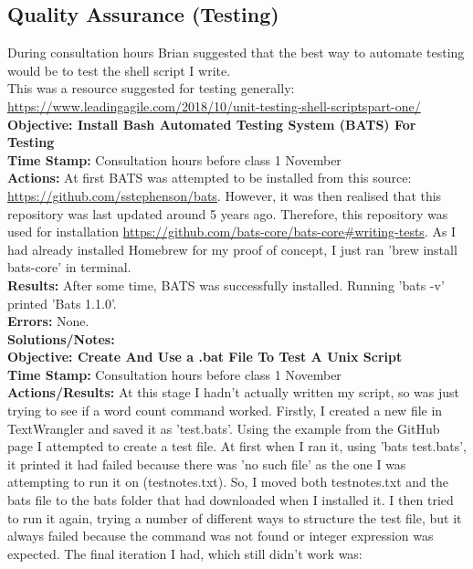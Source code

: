 \documentclass{article}
\begin{document}
\begin{FlushLeft}
\subsection{Quality Assurance (Testing)}
During consultation hours Brian suggested that the best way to automate testing would be to test the shell script I write.\\
This was a resource suggested for testing generally: \url{https://www.leadingagile.com/2018/10/unit-testing-shell-scriptspart-one/}\\
\vspace{5mm}
\textbf{Objective: Install Bash Automated Testing System (BATS) For Testing}\\
\textbf{Time Stamp:} Consultation hours before class 1 November\\
\textbf{Actions:} At first BATS was attempted to be installed from this source: \url{https://github.com/sstephenson/bats}. However, it was then realised that this repository was last updated around 5 years ago. Therefore, this repository was used for installation \url{https://github.com/bats-core/bats-core#writing-tests}. As I had already installed Homebrew for my proof of concept, I just ran 'brew install bats-core' in terminal.\\
\textbf{Results:} After some time, BATS was successfully installed. Running 'bats -v' printed 'Bats 1.1.0'.\\
\textbf{Errors:} None.\\
\textbf{Solutions/Notes:}\\
\vspace{5mm}
\textbf{Objective: Create And Use a .bat File To Test A Unix Script}\\
\textbf{Time Stamp:} Consultation hours before class 1 November\\
\textbf{Actions/Results:} At this stage I hadn't actually written my script, so was just trying to see if a word count command worked. Firstly, I created a new file in TextWrangler and saved it as 'test.bats'. Using the example from the GitHub page I attempted to create a test file. At first when I ran it, using 'bats test.bats', it printed it had failed because there was 'no such file' as the one I was attempting to run it on (test\textunderscore notes.txt). So, I moved both test\textunderscore notes.txt and the bats file to the bats folder that had downloaded when I installed it. I then tried to run it again, trying a number of different ways to structure the test file, but it always failed because the command was not found or integer expression was expected. The final iteration I had, which still didn't work was:

\end{FlushLeft}
\end{document}
